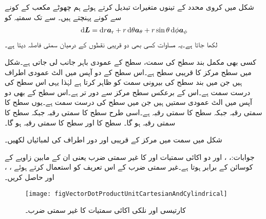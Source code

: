شکل  میں کروی محدد کے تینوں متغیرات تبدیل کرتے ہوئے ہم چھوٹے مکعب کے   کونے سے
  کونے پہنچتے ہیں۔ سے  تک سمتیہ کو
\begin{align}\label{مساوات_سمتیہ_کروی_چھوٹا_فاصلہ}
\dif \kvec{L}=\dif r \ar+r \dif \theta \atheta+r\sin \theta \dif \phi \aphi
\end{align}
لکھا جاتا ہے۔یہ مساوات کسی بھی دو قریبی نقطوں کے درمیان سمتی فاصلہ دیتا ہے۔

کسی بھی مکمل بند سطح کی  سمت، سطح کے عمودی باہر جانب لی جاتی ہے۔شکل  میں  سطح  مرکز کا قریبی سطح ہے۔اس سطح کے دو آپس میں الٹ عمودی اطراف  ہیں جن میں  بند سطح کی بیرونی سمت کو ظاہر کرتا ہے لہٰذا یہی اس سطح کی درست سمت ہے۔اس کے برعکس  سطح مرکز سے دور تر ہے۔اس سطح کے بھی دو آپس میں الٹ عمودی سمتیں  ہیں جن میں  سطح کی درست سمت ہے۔یوں   سطح کا سمتی رقبہ  جبکہ  سطح کا سمتی رقبہ  ہے۔اسی طرح  سطح کا سمتی رقبہ  جبکہ  سطح کا سمتی رقبہ ہو گا۔ سطح کا  اور  سطح کا سمتی رقبہ  ہو گا۔

شکل  میں  سمت میں مرکز کے قریبی اور دور اطراف کی لمبائیاں لکھیں۔

جوابات:، ،  اور 
دو اکائی سمتیات  اور  کا غیر سمتی ضرب  یعنی ان کے مابین زاویے  کے کوسائن کے برابر ہوتا ہے۔غیر سمتی ضرب کے اس تعریف کو استعمال کرتے ہوئے ، ،  اور  حاصل کریں۔
\begin{figure}
\centering
\texttt{[image: figVectorDotProductUnitCartesianAndCylindrical]}
\caption{کارتیسی اور نلکی اکائی سمتیات کا غیر سمتی ضرب۔}
\label{شکل_سمتیہ_غیر_سمتی_ضرب_بذریعہ_تعریف}
\end{figure}

